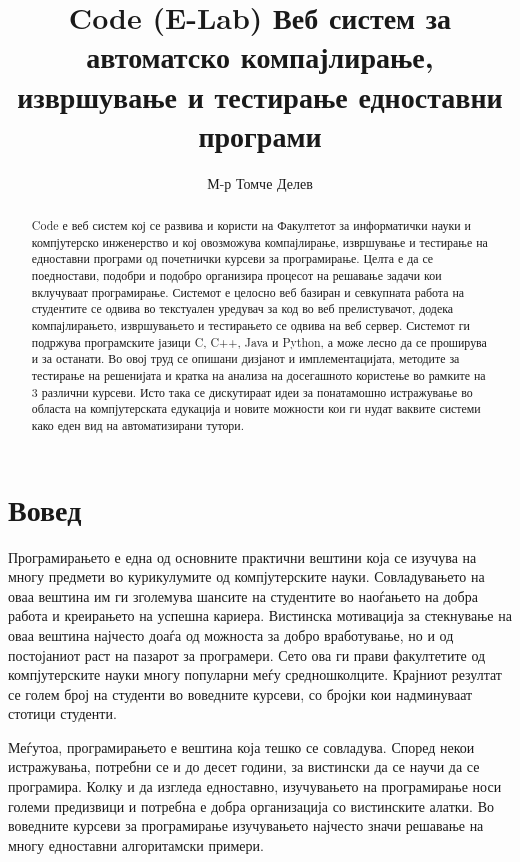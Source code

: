 \documentclass[a4paper,twocolumn]{article}
\begin{document}
\title{Code (E-Lab) Веб систем за автоматско компајлирање, извршување и
тестирање едноставни програми}

\author{М-р Томче Делев}

\maketitle

\begin{abstract}

Code е веб систем кој се развива и користи на Факултетот за информатички науки и
компјутерско инженерство и кој овозможува компајлирање, извршување и тестирање
на едноставни програми од почетнички курсеви за програмирање. Целта е да се
поедностави, подобри и подобро организира процесот на решавање задачи кои
вклучуваат програмирање. Системот е целосно веб базиран и севкупната работа на
студентите се одвива во текстуален уредувач за код во веб прелистувачот, додека
компајлирањето, извршувањето и тестирањето се одвива на веб сервер. Системот ги
подржува програмските јазици C, C++, Java и Python, а може лесно да се проширува
и за останати. Во овој труд се опишани дизјанот и имплементацијата, методите за
тестирање на решенијата и кратка на анализа на досегашното користење во рамките
на 3 различни курсеви. Исто така се дискутираат идеи за понатамошно истражување
во областа на компјутерската едукација и новите можности кои ги нудат ваквите
системи како еден вид на автоматизирани тутори.

\end{abstract}

\section{Вовед}

Програмирањето е една од основните практични вештини која се изучува на многу
предмети во курикулумите од компјутерските науки. Совладувањето на оваа вештина
им ги зголемува шансите на студентите во наоѓањето на добра работа и креирањето
на успешна кариера. Вистинска мотивација за стекнување на оваа вештина најчесто
доаѓа од можноста за добро вработување, но и од постојаниот раст на пазарот за
програмери. Сето ова ги прави факултетите од компјутерските науки многу
популарни меѓу средношколците. Крајниот резултат се голем број на студенти во
воведните курсеви, со бројки кои надминуваат стотици студенти.

Меѓутоа, програмирањето е вештина која тешко се совладува. Според некои
истражувања, потребни се и до десет години, за вистински да се научи да се
програмира. Колку и да изгледа едноставно, изучувањето на програмирање носи
големи предизвици и потребна е добра организација со вистинските алатки. Во
воведните курсеви за програмирање изучувањето најчесто значи решавање на многу
едноставни алгоритамски примери.
\end{document}
